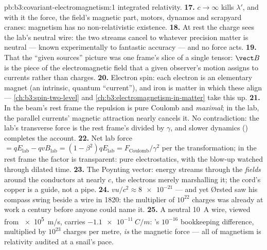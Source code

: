 \begin{solution}{pb:b3:covariant-electromagnetism:1}
integrated relativity.
\textbf{17.} $c \to \infty$ kills $\lambda'$, and with it the force,
the field's magnetic part, motors, dynamos and scrapyard cranes:
magnetism has no non-relativistic existence.
\textbf{18.} At rest the charge sees the lab's neutral wire: the two
streams cancel to whatever precision matter is neutral --- known
experimentally to fantastic accuracy --- and no force acts.
\textbf{19.} That the ``given sources'' picture was one frame's
slice of a single tensor: $\vect B$ is the piece of the
electromagnetic field that a given observer's motion assigns to
currents rather than charges.
\textbf{20.} Electron spin: each electron is an elementary magnet
(an intrinsic, quantum ``current''), and iron is matter in which
these align --- \cref{ch:b3:spin-two-level} and
\cref{ch:b3:electromagnetism-in-matter} take this up.
\textbf{21.} In the beam's rest frame the repulsion is pure Coulomb
and \emph{maximal}; in the lab, the parallel currents' magnetic
attraction nearly cancels it. No contradiction: the lab's transverse
force is the rest frame's divided by $\gamma$, and slower dynamics
() completes the account.
\textbf{22.} Net lab force $= qE_{\text{lab}} - qvB_{\text{lab}} =
(1 - \beta^2)qE_{\text{lab}} = F_{\text{Coulomb}}/\gamma^2$ per the
transformation; in the rest frame the factor is transparent: pure
electrostatics, with the blow-up watched through dilated time.
\textbf{23.} The Poynting vector: energy streams through the
\emph{fields} around the conductors at nearly $c$, the electrons
merely marshalling it; the cord's copper is a guide, not a pipe.
\textbf{24.} $vu/c^2 \approx \num{8e-21}$ --- and yet \O rsted saw
his compass swing beside a wire in 1820: the multiplier of
$10^{22}$ charges was already at work a century before anyone could
name it.
\textbf{25.} A neutral \qty{10}{A} wire, viewed from \qty{e5}{m/s},
carries $\qty{-1.1e-11}{C/m}$: 's $10^{-16}$
bookkeeping difference, multiplied by $10^{23}$ charges per metre,
\emph{is} the magnetic force --- all of magnetism is relativity
audited at a snail's pace.
\end{solution}
